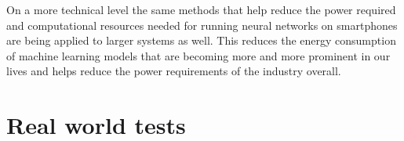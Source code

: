 \documentclass{kththesis}
\begin{document}
On a more technical level the same methods that help reduce the power required
and computational resources needed for running neural networks on smartphones
are being applied to larger systems as well. This reduces the energy consumption
of machine learning models that are becoming more and more prominent in our
lives and helps reduce the power requirements of the industry overall.

\printbibliography[heading=bibintoc]%

\appendix

\chapter{Real world tests} \label{chapter:real_world}
\end{document}
